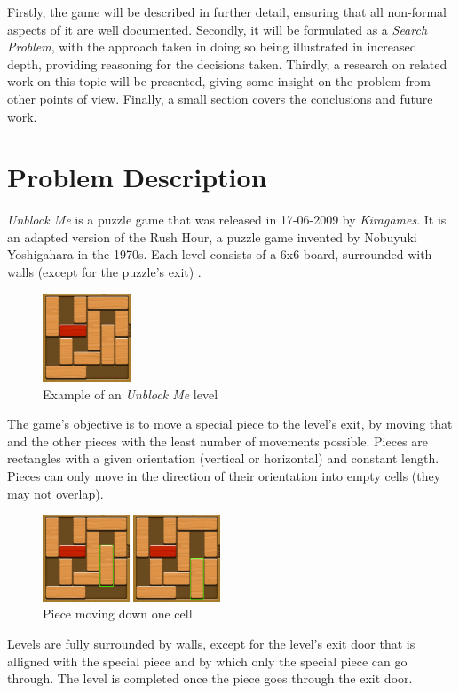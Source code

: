 \documentclass[conference]{IEEEtran}
\begin{document}
Firstly, the game will be described in further detail, ensuring that all non-formal aspects of it are well documented. Secondly, it will be formulated as a \textit{Search Problem}, with the approach taken in doing so being illustrated in increased depth, providing reasoning for the decisions taken. Thirdly, a research on related work on this topic will be presented, giving some insight on the problem from other points of view.
{\huge Finally, a small section covers the conclusions and future work.}

\section{Problem Description}
\textit{Unblock Me} is a puzzle game that was released in 17-06-2009 by \textit{Kiragames}. It is an adapted version of the Rush Hour, a puzzle game invented by Nobuyuki Yoshigahara in the 1970s. Each level consists of a 6x6 board, surrounded with walls (except for the puzzle's exit) \cite{b1}. 

\begin{figure}[H]
    \centerline{\includegraphics[width=100px]{img1.png}}
    \caption{Example of an \textit{Unblock Me} level}
\end{figure}

The game's objective is to move a special piece to the level's exit, by moving that and the other pieces with the least number of movements possible. Pieces are rectangles with a given orientation (vertical or horizontal) and constant length. Pieces can only move in the direction of their orientation into empty cells (they may not overlap).  

\begin{figure}[H]
    \centerline{\includegraphics[width=200px]{img2.png}}
    \caption{Piece moving down one cell}
\end{figure}

Levels are fully surrounded by walls, except for the level's exit door that is alligned with the special piece and by which only the special piece can go through. The level is completed once the piece goes through the exit door.
 
\end{document}
